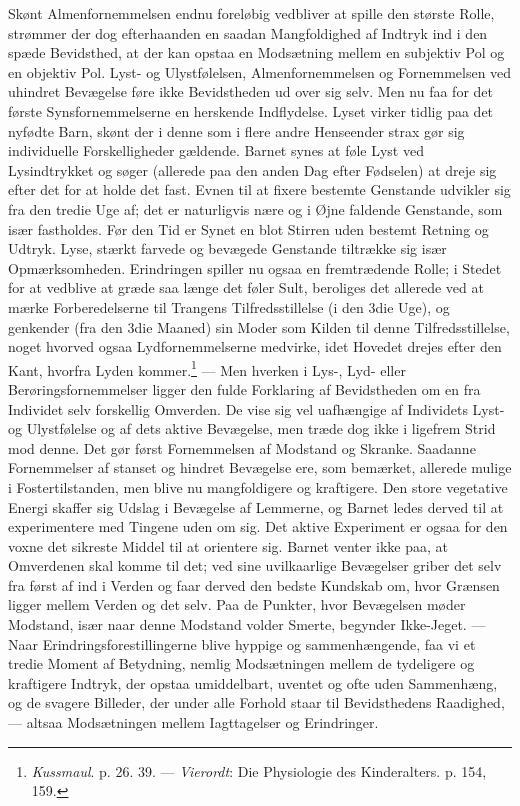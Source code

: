 \documentclass[12pt,a4paper,openany]{book}
\newcommand{\opage}[1]{\marginnote{\footnotesize\textit{[#1]}}}
\begin{document}
Skønt Almenfornemmelsen endnu foreløbig vedbliver at spille den største
Rolle, strømmer der dog efterhaanden en saadan Mangfoldighed af Indtryk
ind i den spæde Bevidsthed, at der kan opstaa en Modsætning mellem en
subjektiv Pol og en objektiv Pol. Lyst- og Ulystfølelsen,
Almenfornemmelsen og Fornemmelsen ved uhindret Bevægelse føre ikke
Bevidstheden ud over sig selv. Men nu faa for det første
Synsfornemmelserne en herskende Indflydelse. Lyset virker tidlig paa det
nyfødte Barn, skønt der i denne som i flere andre Henseender strax gør
sig individuelle Forskelligheder gældende. Barnet synes at føle Lyst ved
Lysindtrykket og søger (allerede paa den anden Dag efter Fødselen) at
dreje sig efter det for at holde det fast. Evnen til at fixere bestemte
Genstande udvikler sig fra den tredie Uge af; det er naturligvis nære og
i Øjne faldende Genstande, som især fastholdes. Før den Tid
\opage{5}er Synet en blot Stirren uden bestemt Retning og Udtryk. Lyse,
stærkt farvede og bevægede Genstande tiltrække sig især Opmærksomheden.
Erindringen spiller nu ogsaa en fremtrædende Rolle; i Stedet for at
vedblive at græde saa længe det føler Sult, beroliges det allerede ved
at mærke Forberedelserne til Trangens Tilfredsstillelse (i den 3die
Uge), og genkender (fra den 3die Maaned) sin Moder som Kilden til denne
Tilfredsstillelse, noget hvorved ogsaa Lydfornemmelserne medvirke, idet
Hovedet drejes efter den Kant, hvorfra Lyden
kommer.\footnote[1]{\emph{Kussmaul}. p. 26. 39. --- \emph{Vierordt}: Die
Physiologie des Kinderalters. p. 154, 159.} --- Men hverken i Lys-, Lyd-
eller Berøringsfornemmelser ligger den fulde Forklaring af Bevidstheden
om en fra Individet selv forskellig Omverden. De vise sig vel uafhængige
af Individets Lyst- og Ulystfølelse og af dets aktive Bevægelse, men
træde dog ikke i ligefrem Strid mod denne. Det gør først Fornemmelsen af
Modstand og Skranke. Saadanne Fornemmelser af stanset og hindret
Bevægelse ere, som bemærket, allerede mulige i Fostertilstanden, men
blive nu mangfoldigere og kraftigere. Den store vegetative Energi
skaffer sig Udslag i Bevægelse af Lemmerne, og Barnet ledes derved til
at experimentere med Tingene uden om sig. Det aktive Experiment er ogsaa
for den voxne det sikreste Middel til at orientere sig. Barnet venter
ikke paa, at Omverdenen skal komme til det; ved sine uvilkaarlige
Bevægelser griber det selv fra først af ind i Verden og faar derved den
bedste Kundskab om, hvor Grænsen ligger mellem Verden og det selv. Paa
de Punkter, hvor Bevægelsen møder Modstand, især naar denne Modstand
volder Smerte, begynder Ikke-Jeget. --- Naar Erindringsforestillingerne
blive hyppige og sammenhængende, faa vi et tredie Moment af Betydning,
nemlig Modsætningen mellem de tydeligere og kraftigere Indtryk, der
opstaa umiddelbart, uventet og ofte uden Sammenhæng, og de svagere
Billeder, der under alle Forhold staar til Bevidsthedens Raadighed, ---
altsaa Modsætningen mellem Iagttagelser og Erindringer.
\end{document}
